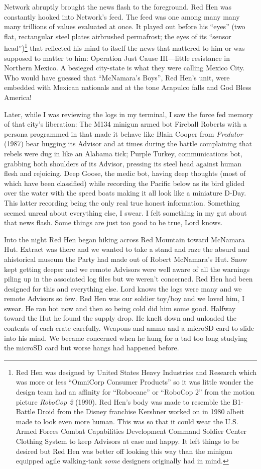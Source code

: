 \documentclass[13pt|draft]{report}
\begin{document}
Network abruptly brought the news flash to the foreground. Red Hen was constantly hooked into Network's feed. The feed was one among many many many trillions of values evaluated at once. It played out before his ``eyes'' (two flat, rectangular steel plates airbrushed permafrost; the eyes of its ``sensor head'')\footnote{Red Hen was designed by United States Heavy Industries and Research which was more or less ``OmniCorp Consumer Products'' so it was little wonder the design team had an affinity for ``Robocane'' or ``RoboCop 2'' from the motion picture \textit{RoboCop 2} (1990). Red Hen's body was made to resemble the B1-Battle Droid from the Disney franchise Kershner worked on in 1980 albeit made to look even more human. This was so that it could wear the U.S. Armed Forces Combat Capabilities Development Command Soldier Center Clothing System to keep Advisors at ease and happy. It left things to be desired but Red Hen was better off looking this way than the minigun equipped agile walking-tank \textit{some} designers originally had in mind.} that reflected his mind to itself the news that mattered to him or was supposed to matter to him: Operation Just Cause III---little resistance in Northern Mexico. A besieged city-state is what they were calling Mexico City. Who would have guessed that ``McNamara's Boys'', Red Hen's unit, were embedded with Mexican nationals and at the tone Acapulco falls and God Bless America!

Later, while I was reviewing the logs in my terminal, I saw the force fed memory of that city's liberation: The M134 minigun armed bot Fireball Roberts with a persona programmed in that made it behave like Blain Cooper from \textit{Predator} (1987) bear hugging its Advisor and at times during the battle complaining that rebels were dug in like an Alabama tick; Purple Turkey, communications bot, grabbing both shoulders of its Advisor, pressing its steel head against human flesh and rejoicing. Deep Goose, the medic bot, having deep thoughts (most of which have been classified) while recording the Pacific below as its bird glided over the water with the speed boats making it all look like a miniature D-Day. This latter recording being the only real true honest information. Something seemed unreal about everything else, I swear. I felt something in my gut about that news flash. Some things are just too good to be true, Lord knows.

Into the night Red Hen began hiking across Red Mountain toward McNamara Hut. Extract was there and we wanted to take a stand and raze the absurd and ahistorical museum the Party had made out of Robert McNamara's Hut. Snow kept getting deeper and we remote Advisors were well aware of all the warnings piling up in the associated log files but we weren't concerned. Red Hen had been designed for this and everything else. Lord knows the logs were many and we remote Advisors so few. Red Hen was our soldier toy/boy and we loved him, I swear. He  ran hot now and then so being cold did him some good. Halfway toward the Hut he found the supply drop. He knelt down and unloaded the contents of each crate carefully. Weapons and ammo and a microSD card to slide into his mind. We became concerned when he hung for a tad too long studying the microSD card but worse hangs had happened before.
\end{document}
